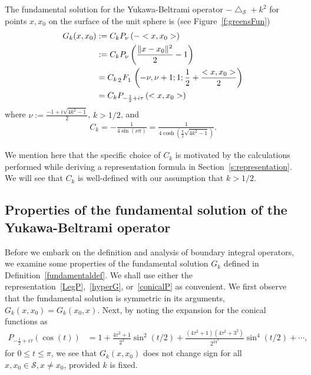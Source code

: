 \documentclass[final]{siamltex}
\newcommand{\lap}{\bigtriangleup}
\newcommand{\C}{C_k}
\renewcommand{\S} {\mathcal{S}}
\begin{document}
\begin{definition}
\label{fundamentaldef} 
The fundamental solution for the Yukawa-Beltrami operator $-\lap_\S +
k^2$ for points $x,x_0$ on the surface of the unit sphere is (see
Figure~\ref{f:greensFun})
\begin{subequations}
  \begin{align}
    G_k(x,x_{0})&:=\C P_{\nu}\left(-<x,x_{0}>\right) \nonumber \\
    &:=\C P_{\nu}\left(\frac{\|x-x_{0}\|^2}{2}-1\right) \label{LegP} \\
    &= \C\, \tensor[_2]{F}{_1} \left(-\nu, \nu+1; 1; \frac{1}{2}+
      \frac{<x,x_{0}>}{2}\right)\label{hyperG} \\
    &=\C P_{-\frac{1}{2} + i \tau} \left(<x,x_{0}>\right)\label{conicalP}
  \end{align} 
\end{subequations}
where 
$\nu:=\frac{-1+i\sqrt{4k^2-1}}{2}$, $k>1/2$, and 
\begin{align}
  \label{constant-definition}    
  \C=-\frac{1}{4\sin(\nu\pi)} 
    =\frac{1}{4\cosh(\frac{\pi}{2}\sqrt{4k^2-1})}.
\end{align}
\end{definition}
We mention here that the specific choice of $\C$ is motivated by the
calculations performed while deriving a representation formula in
Section~\ref{s:representation}.  We will see that $\C$ is well-defined
with our assumption that $k>1/2$.


\subsection{Properties of the fundamental solution of the Yukawa-Beltrami operator}
Before we embark on the definition and analysis of boundary integral operators, we examine some properties of the fundamental solution $G_k$
defined in Definition~\ref{fundamentaldef}. We shall use either the
representation~\eqref{LegP},~\eqref{hyperG}, or~\eqref{conicalP} as
convenient. 
We first observe that the fundamental solution is symmetric in its arguments, $G_k(x,x_{0}) = G_k(x_{0},x)$. Next, by noting the expansion for the conical functions as~\cite{lebedev}
\begin{align*}
  P_{-\frac{1}{2}+i \tau} (\cos(t)) &= 1+
    \frac{4\tau^2+1}{2^2}\sin^2(t/2) + 
      \frac{(4\tau^2+1)(4\tau^2+3^2)}{2^24^2}\sin^4(t/2) + 
    \cdots,
\end{align*}
for $0\leq t\leq \pi$, we see that $G_k(x,x_0)$ does not change sign for
all $x,x_{0} \in \S, x \neq x_{0}$, provided $k$ is fixed.
\end{document}
